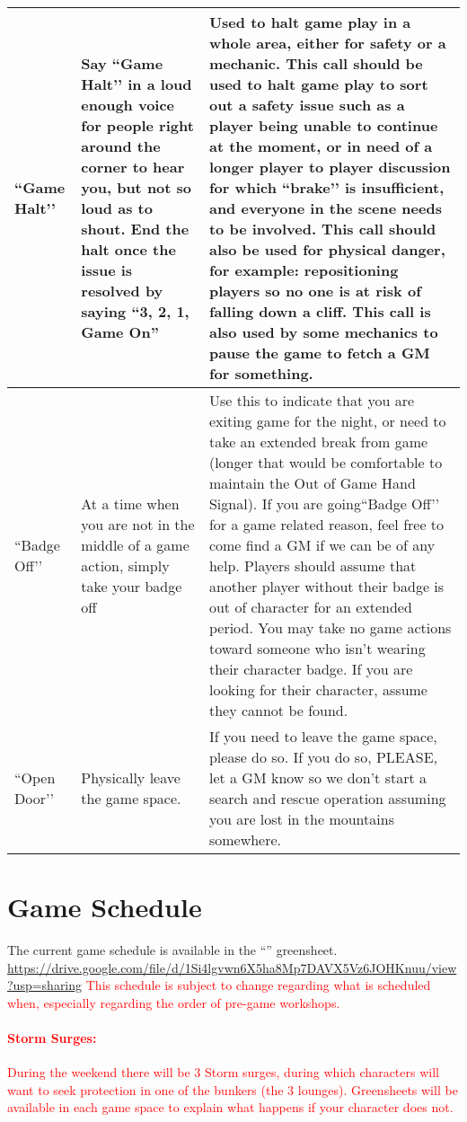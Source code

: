 \documentclass[sheet]{GL2020}
\begin{document}
\begin{tabularx}{\textwidth}{|>{\centering\arraybackslash} m{1.5cm} | >{\centering\arraybackslash} m{2.5cm} | >{\centering\arraybackslash}X |}
    \hline
``Game Halt'’ & Say ``Game Halt'’ in a loud enough voice for people right around the corner to hear you, but not so loud as to shout. End the halt once the issue is resolved by saying “3, 2, 1, Game On” &  Used to halt game play in a whole area, either for safety or a mechanic. This call should be used to halt game play to sort out a safety issue such as a player being unable to continue at the moment, or in need of a longer player to player discussion for which ``brake'’ is insufficient, and everyone in the scene needs to be involved. This call should also be used for physical danger, for example: repositioning players so no one is at risk of falling down a cliff. This call is also used by some mechanics to pause the game to fetch a GM for something. \\
    \hline
``Badge Off'’ & At a time when you are not in the middle of a game action, simply take your badge off & Use this to indicate that you are exiting game for the night, or need to take an extended break from game (longer that would be comfortable to maintain the Out of Game Hand Signal). If you are going``Badge Off'’ for a game related reason, feel free to come find a GM if we can be of any help. Players should assume that another player without their badge is out of character for an extended period. You may take no game actions toward someone who isn't wearing their character badge. If you are looking for their character, assume they cannot be found. \\
    \hline
``Open Door'’ & Physically leave the game space. & If you need to leave the game space, please do so. If you do so, PLEASE, let a GM know so we don't start a search and rescue operation assuming you are lost in the mountains somewhere. \\
    \hline
\end{tabularx}

\section{Game Schedule}
The current game	schedule is available in the ``\gWeekendSchedule{\MYname}'' greensheet. \url{https://drive.google.com/file/d/1Si4lgvwn6X5ha8Mp7DAVX5Vz6JOHKnuu/view?usp=sharing} \textcolor{red}{This schedule is subject to change regarding what is scheduled when, especially regarding the order of pre-game workshops.}

\textcolor{red}{\paragraph{Storm Surges:} During the weekend there will be 3 Storm surges, during which characters will want to seek protection in one of the bunkers (the 3 lounges). Greensheets will be available in each game space to explain what happens if your character does not.}
\end{document}
